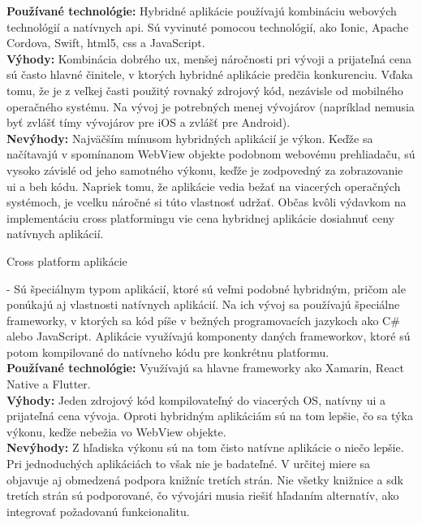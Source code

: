 \begin{itemize}[leftmargin=*]
{\bf Používané technológie:} Hybridné aplikácie používajú kombináciu webových technológií a natívnych \acrshort{api}. Sú vyvinuté pomocou technológií, ako Ionic, Apache Cordova, Swift, \acrshort{html}5, \acrshort{css} a JavaScript. \cite{ma3} \\

{\bf Výhody:} Kombinácia dobrého \acrshort{ux}, menšej náročnosti pri vývoji a prijateľná cena sú často hlavné činitele, v ktorých hybridné aplikácie predčia konkurenciu. Vďaka tomu, že je z veľkej časti použitý rovnaký zdrojový kód, nezávisle od mobilného operačného systému. Na vývoj je potrebných menej vývojárov (napríklad nemusia byť zvlášť tímy vývojárov pre iOS a zvlášť pre Android). \cite{ma4} \\
 
{\bf Nevýhody:} Najväčším mínusom hybridných aplikácií je výkon. Keďže sa načítavajú v spomínanom WebView objekte podobnom webovému prehliadaču, sú vysoko závislé od jeho samotného výkonu, keďže je zodpovedný za zobrazovanie \acrshort{ui} a beh kódu. Napriek tomu, že aplikácie vedia bežať na viacerých operačných systémoch, je vcelku náročné si túto vlastnosť udržať. Občas kvôli výdavkom na implementáciu cross platformingu vie cena hybridnej aplikácie dosiahnuť ceny natívnych aplikácií. \cite{ma4} \cite{ma5} \\

{\bf \item Cross platform aplikácie} - Sú špeciálnym typom aplikácií, ktoré sú veľmi podobné hybridným, pričom ale ponúkajú aj vlastnosti natívnych aplikácií. Na ich vývoj sa používajú špeciálne frameworky, v ktorých sa kód píše v bežných programovacích jazykoch ako C\# alebo JavaScript. Aplikácie využívajú komponenty daných frameworkov, ktoré sú potom kompilované do natívneho kódu pre konkrétnu platformu. \\

{\bf Používané technológie:} Využívajú sa hlavne frameworky ako Xamarin, React Native a Flutter. \cite{ma6} \\

{\bf Výhody:} Jeden zdrojový kód kompilovateľný do viacerých OS, natívny \acrshort{ui} a prijateľná cena vývoja. Oproti hybridným aplikáciám sú na tom lepšie, čo sa týka výkonu, keďže nebežia vo WebView objekte. \\
 
{\bf Nevýhody:} Z hľadiska výkonu sú na tom čisto natívne aplikácie o niečo lepšie. Pri jednoduchých aplikáciách to však nie je badateľné. V určitej miere sa objavuje aj obmedzená podpora knižníc tretích strán. Nie všetky knižnice a \acrshort{sdk} tretích strán sú podporované, čo vývojári musia riešiť hľadaním alternatív, ako integrovať požadovanú funkcionalitu. \cite{ma6} \\
\end{itemize}

